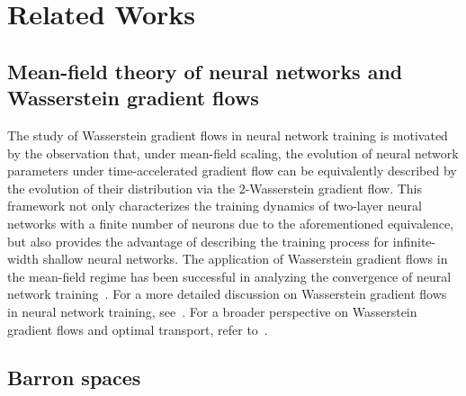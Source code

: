 \section{Related Works}
\subsection{Mean-field theory of neural networks and Wasserstein gradient flows}

The study of Wasserstein gradient flows in neural network training is motivated by the observation that, under mean-field scaling, the evolution of neural network parameters under time-accelerated gradient flow can be equivalently described by the evolution of their distribution via the 2-Wasserstein gradient flow. This framework not only characterizes the training dynamics of two-layer neural networks with a finite number of neurons due to the aforementioned equivalence, but also provides the advantage of describing the training process for infinite-width shallow neural networks. The application of Wasserstein gradient flows in the mean-field regime has been successful in analyzing the convergence of neural network training~\cite{chizat2018global,mei2018mean,rotskoff2018neural,lu2020mean,nitanda2021particle}. For a more detailed discussion on Wasserstein gradient flows in neural network training, see~\cite{chizat2018global,chizat2020implicit,wojtowytsch2020convergence}. For a broader perspective on Wasserstein gradient flows and optimal transport, refer to~\cite{villani2009optimal}.

\subsection{Barron spaces}


